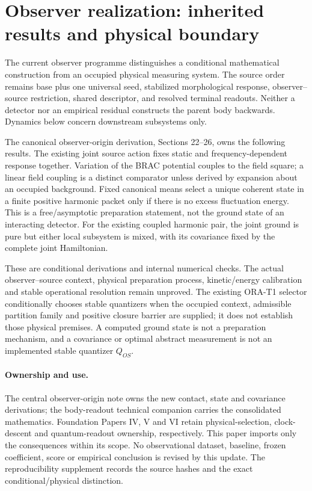 \section{Observer realization: inherited results and physical boundary}
\label{sec:observer-update-20260914}
The current observer programme distinguishes a conditional mathematical
construction from an occupied physical measuring system. The source order
remains base plus one universal seed, stabilized morphological response,
observer--source restriction, shared descriptor, and resolved terminal
readouts. Neither a detector nor an empirical residual constructs the parent
body backwards. Dynamics below concern downstream subsystems only.

The canonical observer-origin derivation, Sections 22--26, owns the following
results. The existing joint source action fixes static and frequency-dependent
response together. Variation of the BRAC potential couples to the field
square; a linear field coupling is a distinct comparator unless derived by
expansion about an occupied background. Fixed canonical means select a unique
coherent state in a finite positive harmonic packet only if there is no excess
fluctuation energy. This is a free/asymptotic preparation statement, not the
ground state of an interacting detector. For the existing coupled harmonic
pair, the joint ground is pure but either local subsystem is mixed, with its
covariance fixed by the complete joint Hamiltonian.

These are conditional derivations and internal numerical checks. The actual
observer--source context, physical preparation process, kinetic/energy
calibration and stable operational resolution remain unproved. The existing
ORA-T1 selector conditionally chooses stable quantizers when the occupied
context, admissible partition family and positive closure barrier are supplied;
it does not establish those physical premises. A computed ground state is not
a preparation mechanism, and a covariance or optimal abstract measurement is
not an implemented stable quantizer $Q_{OS}$.

\paragraph{Ownership and use.}
The central observer-origin note owns the new contact, state and covariance
derivations; the body-readout technical companion carries the consolidated
mathematics. Foundation Papers IV, V and VI retain physical-selection,
clock-descent and quantum-readout ownership, respectively. This paper imports
only the consequences within its scope. No observational dataset, baseline,
frozen coefficient, score or empirical conclusion is revised by this update.
The reproducibility supplement records the source hashes and the exact
conditional/physical distinction.


